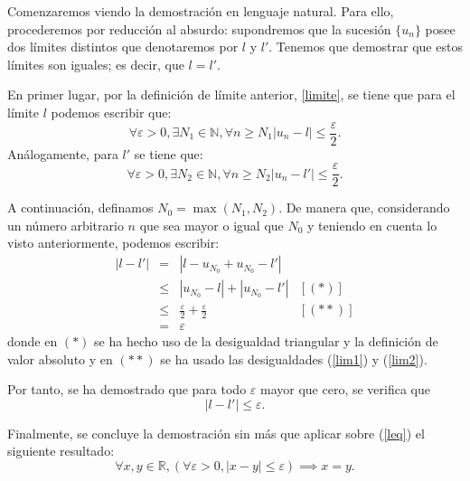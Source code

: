 \begin{demostracion}
  Comenzaremos viendo la demostración en lenguaje natural. Para ello,
  procederemos por reducción al absurdo: supondremos que la sucesión
  \(\{u_n\}\) posee dos límites distintos que denotaremos por \(l\)
  y \(l'\). Tenemos que demostrar que estos límites son iguales;
  es decir, que \(l=l'\).

  En primer lugar, por la definición de límite anterior, \ref{limite},
  se tiene que para el límite \(l\) podemos escribir que:
  \begin{equation}\label{lim1}
    ∀ ε > 0, ∃ N_1 ∈ ℕ, ∀ n ≥ N_1 |u_n-l| ≤ \frac{ε}{2}.
  \end{equation}
  Análogamente, para \(l'\) se tiene que:
  \begin{equation}\label{lim2}
    ∀ ε > 0, ∃ N_2 ∈ ℕ, ∀ n ≥ N_2 |u_n-l'| ≤ \frac{ε}{2}.
  \end{equation}

  A continuación, definamos \(N_0 = \max(N_1,N_2)\).  De manera que,
  considerando un número arbitrario \(n\) que sea mayor o igual que
  \(N_0\) y teniendo en cuenta lo visto anteriormente, podemos escribir:
  \[\begin{array}{llll}
      |l-l'| &= &|l-u_{N_0}+u_{N_0}-l'|   & \\
             &≤ &|u_{N_0}-l|+|u_{N_0}-l'| & [(*)] \\
             &≤ &\frac{ε}{2}+\frac{ε}{2} & [(**)] \\
             &= &ε
  \end{array}\]
  donde en \((*)\) se ha hecho uso de la desigualdad triangular y la
  definición de valor absoluto y en \((**)\) se ha usado las
  desigualdades (\ref{lim1}) y (\ref{lim2}).

  Por tanto, se ha demostrado que para todo \(ε\) mayor que cero, se
  verifica que
  \begin{equation}\label{leq}
    |l-l'| ≤ ε.
  \end{equation}

  Finalmente, se concluye la demostración sin más que aplicar sobre
  (\ref{leq}) el siguiente resultado:
  \begin{equation}
    ∀ x, y ∈ ℝ, (∀ ε > 0, |x - y| ≤ ε) ⟹ x = y.
  \end{equation}
\end{demostracion}

